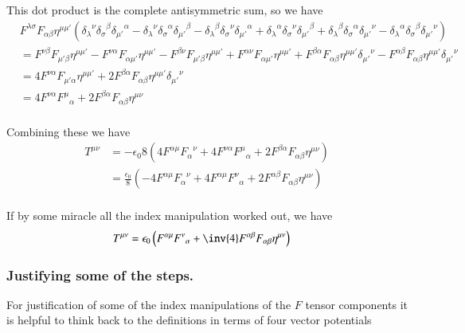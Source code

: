\documentclass{article}
\begin{document}
This dot product is the complete antisymmetric sum, so we have
\begin{align*}
&
F^{\lambda\sigma} F_{\alpha\beta} 
\eta^{\mu\mu'} 
(
{\delta_\lambda}^\nu {\delta_\sigma}^\beta {\delta_{\mu'}}^\alpha
-{\delta_\lambda}^\nu {\delta_\sigma}^\alpha {\delta_{\mu'}}^\beta
-{\delta_\lambda}^\beta {\delta_\sigma}^\nu {\delta_{\mu'}}^\alpha
+{\delta_\lambda}^\alpha {\delta_\sigma}^\nu {\delta_{\mu'}}^\beta
+{\delta_\lambda}^\beta {\delta_\sigma}^\alpha {\delta_{\mu'}}^\nu
-{\delta_\lambda}^\alpha {\delta_\sigma}^\beta {\delta_{\mu'}}^\nu
) \\
&=
  F^{\nu\beta} F_{{\mu'}\beta} \eta^{\mu\mu'} 
- F^{\nu\alpha} F_{\alpha{\mu'}} \eta^{\mu\mu'}
- F^{\beta\nu} F_{{\mu'}\beta} \eta^{\mu\mu'} 
+ F^{\alpha\nu} F_{\alpha{\mu'}} \eta^{\mu\mu'} 
+ F^{\beta\alpha} F_{\alpha\beta} \eta^{\mu\mu'} {\delta_{\mu'}}^\nu
- F^{\alpha\beta} F_{\alpha\beta} \eta^{\mu\mu'} {\delta_{\mu'}}^\nu
 \\
&=
4 F^{\nu\alpha} F_{{\mu'}\alpha} \eta^{\mu\mu'} 
+ 2 F^{\beta\alpha} F_{\alpha\beta} \eta^{\mu\mu'} {\delta_{\mu'}}^\nu
 \\
&=
4 F^{\nu\alpha} {F^{\mu}}_{\alpha} 
+ 2 F^{\beta\alpha} F_{\alpha\beta} \eta^{\mu\nu} 
 \\
\end{align*}

Combining these we have
\begin{align*}
T^{\mu\nu}
&= 
-{\epsilon_0}{8} \left(
 4 F^{\alpha\mu} {F_{\alpha}}^{\nu} 
+ 4 F^{\nu\alpha} {F^{\mu}}_{\alpha} 
+ 2 F^{\beta\alpha} F_{\alpha\beta} \eta^{\mu\nu} 
\right) \\
&= 
\frac{\epsilon_0}{8} \left(
- 4 F^{\alpha\mu} {F_{\alpha}}^{\nu} 
+ 4 F^{\alpha\mu} {F^{\nu}}_{\alpha}
+ 2 F^{\alpha\beta} F_{\alpha\beta} \eta^{\mu\nu} 
\right) \\
\end{align*}


If by some miracle all the index manipulation worked out, we have
\begin{align}
T^{\mu\nu} &= {\epsilon_0} \left( F^{\alpha\mu} {F^{\nu}}_{\alpha} + \inv{4} F^{\alpha\beta} F_{\alpha\beta} \eta^{\mu\nu} \right)
\end{align}

\subsubsection{ Justifying some of the steps. }

For justification of some of the 
index manipulations of the $F$ tensor components it is 
helpful to think back to the definitions in terms of four vector potentials
\end{document}
